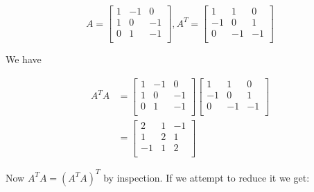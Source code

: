 \documentclass[12pt,letterpaper]{article}
\begin{document}
\begin{enumerate}[label=\S 2.\arabic*]
\begin{enumerate}
          \[
            A
            =
            \begin{bmatrix}
               1 & -1 &  0 \\
               1 &  0 & -1 \\
               0 &  1 & -1 \\
            \end{bmatrix}
            ,
            A^T
            =
            \begin{bmatrix}
               1 &  1 &  0 \\
              -1 &  0 &  1 \\
               0 & -1 & -1 \\
            \end{bmatrix}
          \]

          We have

          \begin{align*}
            A^TA &=
            \begin{bmatrix}
               1 & -1 &  0 \\
               1 &  0 & -1 \\
               0 &  1 & -1 \\
            \end{bmatrix}
            \begin{bmatrix}
               1 &  1 &  0 \\
              -1 &  0 &  1 \\
               0 & -1 & -1 \\
            \end{bmatrix}
            \\
            &=
            \begin{bmatrix}
               2 & 1 & -1 \\
               1 & 2 &  1 \\
              -1 & 1 &  2 \\
            \end{bmatrix}
          \end{align*}

          Now $A^TA = \left(A^TA\right)^T$ by inspection.
          If we attempt to reduce it we get:


\end{enumerate}
\end{enumerate}
\end{document}
